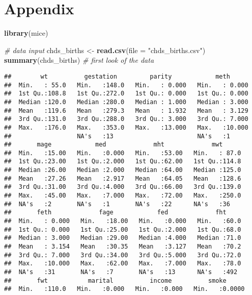 \documentclass[]{article}
\newenvironment{Shaded}{\begin{snugshade}}{\end{snugshade}}
\newcommand{\KeywordTok}[1]{\textcolor[rgb]{0.13,0.29,0.53}{\textbf{#1}}}
\newcommand{\DataTypeTok}[1]{\textcolor[rgb]{0.13,0.29,0.53}{#1}}
\newcommand{\StringTok}[1]{\textcolor[rgb]{0.31,0.60,0.02}{#1}}
\newcommand{\CommentTok}[1]{\textcolor[rgb]{0.56,0.35,0.01}{\textit{#1}}}
\newcommand{\NormalTok}[1]{#1}
\begin{document}
\section{Appendix}

\begin{Shaded}
\begin{Highlighting}[]
\KeywordTok{library}\NormalTok{(mice)}

\CommentTok{# data input }
\NormalTok{chds_births <-}\StringTok{ }\KeywordTok{read.csv}\NormalTok{(}\DataTypeTok{file =} \StringTok{"chds_births.csv"}\NormalTok{)}
\KeywordTok{summary}\NormalTok{(chds_births) }\CommentTok{# first look of the data}
\end{Highlighting}
\end{Shaded}

\begin{verbatim}
##        wt          gestation         parity            meth       
##  Min.   : 55.0   Min.   :148.0   Min.   : 0.000   Min.   : 0.000  
##  1st Qu.:108.8   1st Qu.:272.0   1st Qu.: 0.000   1st Qu.: 0.000  
##  Median :120.0   Median :280.0   Median : 1.000   Median : 3.000  
##  Mean   :119.6   Mean   :279.3   Mean   : 1.932   Mean   : 3.129  
##  3rd Qu.:131.0   3rd Qu.:288.0   3rd Qu.: 3.000   3rd Qu.: 7.000  
##  Max.   :176.0   Max.   :353.0   Max.   :13.000   Max.   :10.000  
##                  NA's   :13                       NA's   :1       
##       mage            med             mht             mwt       
##  Min.   :15.00   Min.   :0.000   Min.   :53.00   Min.   : 87.0  
##  1st Qu.:23.00   1st Qu.:2.000   1st Qu.:62.00   1st Qu.:114.8  
##  Median :26.00   Median :2.000   Median :64.00   Median :125.0  
##  Mean   :27.26   Mean   :2.917   Mean   :64.05   Mean   :128.6  
##  3rd Qu.:31.00   3rd Qu.:4.000   3rd Qu.:66.00   3rd Qu.:139.0  
##  Max.   :45.00   Max.   :7.000   Max.   :72.00   Max.   :250.0  
##  NA's   :2       NA's   :1       NA's   :22      NA's   :36     
##       feth             fage            fed             fht      
##  Min.   : 0.000   Min.   :18.00   Min.   :0.000   Min.   :60.0  
##  1st Qu.: 0.000   1st Qu.:25.00   1st Qu.:2.000   1st Qu.:68.0  
##  Median : 3.000   Median :29.00   Median :4.000   Median :71.0  
##  Mean   : 3.154   Mean   :30.35   Mean   :3.127   Mean   :70.2  
##  3rd Qu.: 7.000   3rd Qu.:34.00   3rd Qu.:5.000   3rd Qu.:72.0  
##  Max.   :10.000   Max.   :62.00   Max.   :7.000   Max.   :78.0  
##  NA's   :31       NA's   :7       NA's   :13      NA's   :492   
##       fwt           marital          income          smoke       
##  Min.   :110.0   Min.   :0.000   Min.   :0.000   Min.   :0.0000  

\end{verbatim}
\end{document}
